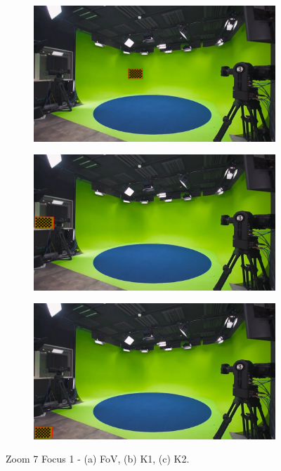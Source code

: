 \begin{figure}[h]
    \centering
    \begin{subfigure}[b]{0.45\textwidth}
        \includegraphics[width=\textwidth]{Images/08annex/results/13.2.png}
        \caption{}
        \label{fig:a2}
    \end{subfigure}
    \hfill
    \begin{subfigure}[b]{0.45\textwidth}
        \includegraphics[width=\textwidth]{Images/08annex/results/13.3.png}
        \caption{}
        \label{fig:b2}
    \end{subfigure}
    
    \vspace{0.5cm}
    
    \begin{subfigure}[b]{0.45\textwidth}
        \includegraphics[width=\textwidth]{Images/08annex/results/13.4.png}
        \caption{}
        \label{fig:c2}
    \end{subfigure}

    \caption{Zoom 7 Focus 1 - (a) FoV, (b) K1, (c) K2.}
    \label{fig:vir_fov_cal}
\end{figure}
